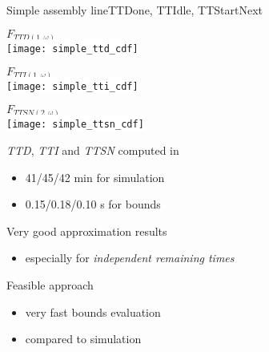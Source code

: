     \begin{frame}{Simple assembly line}{TTDone, TTIdle, TTStartNext}
      \begin{minipage}{0.3\textwidth}
        \begin{center}
          {\tiny $F_{TTD(1,\omega)}$}\\
          \colorbox{white}{\texttt{[image: simple\_ttd\_cdf]}}
        \end{center}
      \end{minipage}
      \begin{minipage}{0.3\textwidth}
        \begin{center}
          {\tiny $F_{TTI(1,\omega)}$}\\
          \colorbox{white}{\texttt{[image: simple\_tti\_cdf]}}
        \end{center}
      \end{minipage}
      \begin{minipage}{0.3\textwidth}
        \begin{center}
          {\tiny $F_{TTSN(2,\omega)}$}\\
          \colorbox{white}{\texttt{[image: simple\_ttsn\_cdf]}}
        \end{center}
      \end{minipage}
      
      \begin{minipage}{0.5\textwidth}
        \textit{TTD}, \textit{TTI} and \textit{TTSN} computed in
        \begin{itemize}
          \item 41/45/42 min for simulation
          \item 0.15/0.18/0.10 s for bounds
        \end{itemize}
      \end{minipage}
      \begin{minipage}{0.45\textwidth}
        \vspace{2em}
        Very good approximation results
        \begin{itemize}
          \item especially for \textit{independent remaining times}
        \end{itemize}
        Feasible approach
        \begin{itemize}
          \item very fast bounds evaluation
          \item compared to simulation
        \end{itemize}
      \end{minipage}
    \end{frame}
  
